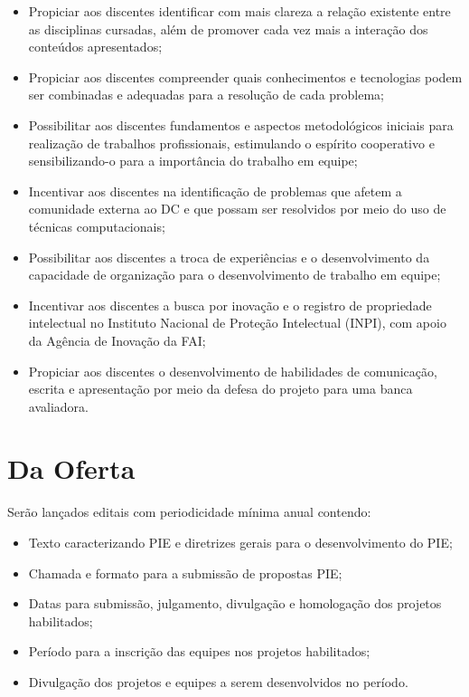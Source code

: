 \documentclass[11pt,a4paper]{report}
\begin{document}
\begin{itemize}
    \item Propiciar aos discentes identificar com mais clareza a relação existente entre as disciplinas cursadas, além de promover cada vez mais a interação dos conteúdos apresentados;
    
    \item Propiciar aos discentes compreender quais conhecimentos e tecnologias podem ser combinadas e adequadas para a resolução de cada problema;
    
    \item Possibilitar aos discentes fundamentos e aspectos metodológicos iniciais para realização de trabalhos profissionais, estimulando o espírito cooperativo e sensibilizando-o para a importância do trabalho em equipe;
    
    \item Incentivar aos discentes na identificação de problemas que afetem a comunidade externa ao DC e que possam ser resolvidos por meio do uso de técnicas computacionais;
        
    \item Possibilitar aos discentes a troca de experiências e o desenvolvimento da capacidade de organização para o desenvolvimento de trabalho em equipe;
    
    \item Incentivar aos discentes a busca por inovação e o registro de propriedade intelectual no Instituto Nacional de Proteção Intelectual (INPI), com apoio da Agência de Inovação da FAI;
    
    \item Propiciar aos discentes o desenvolvimento de habilidades de comunicação, escrita e apresentação por meio da defesa do projeto para uma banca avaliadora.
\end{itemize}


\section{Da Oferta}

Serão lançados editais com periodicidade mínima anual contendo:

\begin{itemize}
    \item Texto caracterizando PIE e diretrizes gerais para o desenvolvimento do PIE;
    \item Chamada e formato para a submissão de propostas PIE;
    \item Datas para submissão, julgamento, divulgação e homologação dos projetos habilitados;
    \item Período para a inscrição das equipes nos projetos habilitados;
    \item Divulgação dos projetos e equipes a serem desenvolvidos no período.
\end{itemize}
\end{document}
